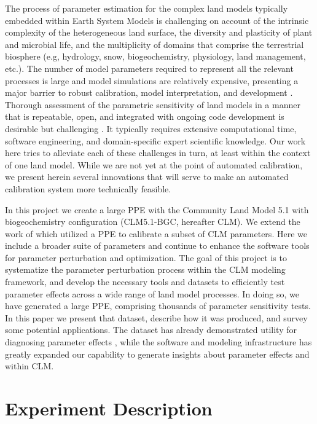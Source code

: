 \documentclass[draft]{agujournal2019}
\begin{document}
The process of parameter estimation for the complex land models typically embedded within Earth System Models is challenging on account of the intrinsic complexity of the heterogeneous land surface, the diversity and plasticity of plant and microbial life, and the multiplicity of domains that comprise the terrestrial biosphere (e.g, hydrology, snow, biogeochemistry, physiology, land management, etc.). The number of model parameters required to represent all the relevant processes is large and model simulations are relatively expensive, presenting a major barrier to robust  calibration, model interpretation, and development \cite{fisher2020,dagon2020}.
Thorough assessment of the parametric sensitivity of land models in a manner that is repeatable, open, and integrated with ongoing code development is desirable but challenging \cite{hourdin2017,balaji2022}. It typically requires extensive computational time,  software engineering, and domain-specific expert scientific knowledge. Our work here tries to alleviate each of these challenges in turn, at least within the context of one land model. While we are not yet at the point of automated calibration, we present herein several innovations that will serve to make an automated calibration system more technically feasible.

In this project we create a large PPE with the Community Land Model 5.1 with biogeochemistry configuration (CLM5.1-BGC, hereafter CLM)\cite{lawrence2019}. We extend the work of  which utilized a PPE to calibrate a subset of CLM parameters. Here we include a broader suite of parameters and continue to enhance the software tools for parameter perturbation and optimization. The goal of this project is to systematize the parameter perturbation process within the CLM modeling framework, and develop the necessary tools and datasets to efficiently test parameter effects across a wide range of land model processes. In doing so, we have generated a large PPE, comprising thousands of parameter sensitivity tests.
In this paper we present that dataset, describe how it was produced, and survey some potential applications.
The dataset has already demonstrated utility for diagnosing parameter effects \cite{cheng2023,yan2023a,yan2023b,zarakas2024}, while the software and modeling infrastructure has greatly expanded our capability to generate insights about parameter effects and   within CLM.




\section{Experiment Description}
\label{methods}
\end{document}
